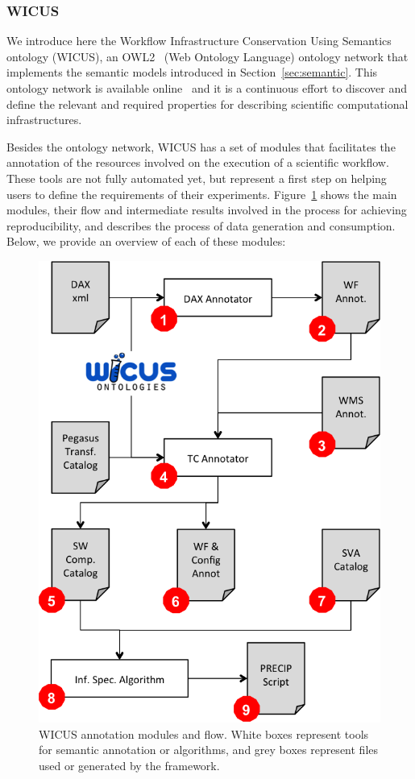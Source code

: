 \subsubsection{WICUS}
We introduce here the Workflow Infrastructure Conservation Using Semantics ontology 
(WICUS), an OWL2~\cite{OWL2} (Web Ontology Language) ontology network that 
implements the semantic models introduced in Section~\ref{sec:semantic}. This ontology 
network is available online~\cite{wicus-online} and it is a continuous effort to discover and 
define the relevant and required properties for describing scientific computational infrastructures. 

Besides the ontology network, WICUS has a set of modules that facilitates the annotation of 
the resources involved on the execution of a scientific workflow. These tools are not fully 
automated yet, but represent a first step on helping users to define the requirements of their 
experiments. Figure~\ref{fig:wicusflow} shows the main modules, their flow and intermediate 
results involved in the process for achieving reproducibility, and describes the process of 
data generation and consumption. Below, we provide an overview of each of these modules:

\begin{figure}[!htb]
	\centering
	\includegraphics[width=.8\linewidth]{figures/wicusflow}
	\caption{WICUS annotation modules and flow. White boxes represent tools for semantic annotation or algorithms, and grey boxes represent files used or generated by the framework.}
	\label{fig:wicusflow}
\end{figure}

